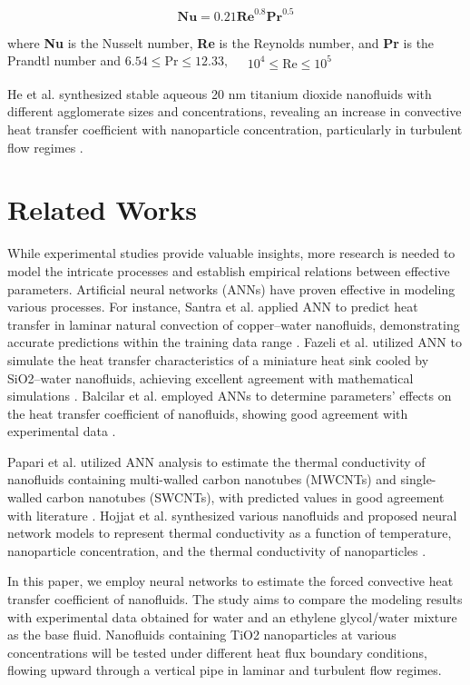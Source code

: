 \documentclass{article}
\begin{document}
\begin{equation}
 \mathbf{Nu} = 0.21 \mathbf{Re}^{0.8} \mathbf{Pr}^{0.5}
\end{equation}

where  \textbf{Nu} is the Nusselt number,  \textbf{Re}  is the Reynolds number, and  \textbf{Pr} is the Prandtl number and $ 6.54 \leq \text{Pr} \leq 12.33, \quad \begin{matrix}
10^4 \leq \text{Re} \leq 10^5
\end{matrix} $

He et al. synthesized stable aqueous 20 nm titanium dioxide nanofluids with different agglomerate sizes and concentrations, revealing an increase in convective heat transfer coefficient with nanoparticle concentration, particularly in turbulent flow regimes \cite{ref2}.


\section{Related Works}

While experimental studies provide valuable insights, more research is needed to model the intricate processes and establish empirical relations between effective parameters. Artificial neural networks (ANNs) have proven effective in modeling various processes. For instance, Santra et al. applied ANN to predict heat transfer in laminar natural convection of copper–water nanofluids, demonstrating accurate predictions within the training data range \cite{ref3}. Fazeli et al. utilized ANN to simulate the heat transfer characteristics of a miniature heat sink cooled by SiO2–water nanofluids, achieving excellent agreement with mathematical simulations \cite{ref4}. Balcilar et al. employed ANNs to determine parameters' effects on the heat transfer coefficient of nanofluids, showing good agreement with experimental data \cite{ref5}.

Papari et al. utilized ANN analysis to estimate the thermal conductivity of nanofluids containing multi-walled carbon nanotubes (MWCNTs) and single-walled carbon nanotubes (SWCNTs), with predicted values in good agreement with literature \cite{ref6}. Hojjat et al. synthesized various nanofluids and proposed neural network models to represent thermal conductivity as a function of temperature, nanoparticle concentration, and the thermal conductivity of nanoparticles \cite{ref7}.

In this paper, we employ neural networks to estimate the forced convective heat transfer coefficient of nanofluids. The study aims to compare the modeling results with experimental data obtained for water and an ethylene glycol/water mixture as the base fluid. Nanofluids containing TiO2 nanoparticles at various concentrations will be tested under different heat flux boundary conditions, flowing upward through a vertical pipe in laminar and turbulent flow regimes.
\end{document}
